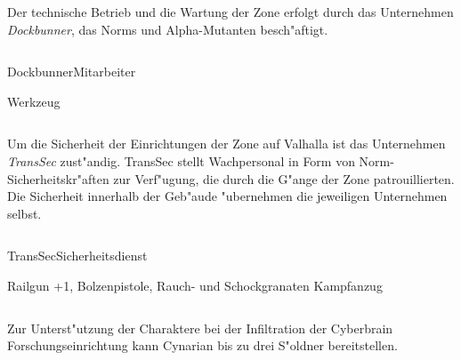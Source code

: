 
\begin{column}[l]{0.45}
    Der technische Betrieb und die Wartung der Zone erfolgt durch das Unternehmen \emph{Dockbunner}, das Norms und Alpha-Mutanten 
    besch"aftigt.
\end{column}
\begin{column}[r]{0.45}
    \begin{nscsheet}[h]{Dockbunner\newline{}Mitarbeiter}
        \nscstats[]
        \nscruler
        \begin{nscinventory}
            \nscitem[Waffen] Werkzeug
        \end{nscinventory}
    \end{nscsheet}
\end{column}    


\begin{column}[l]{0.45}
    Um die Sicherheit der Einrichtungen der Zone auf Valhalla ist das Unternehmen \emph{TransSec} zust"andig. TransSec stellt
    Wachpersonal in Form von Norm-Sicherheitskr"aften zur Verf"ugung, die durch die G"ange der Zone patrouillierten. Die Sicherheit
    innerhalb der Geb"aude "ubernehmen die jeweiligen Unternehmen selbst.
\end{column}
\begin{column}[r]{0.45}
    \begin{nscsheet}[h]{TransSec\newline{}Sicherheitsdienst}
        \nscstats[ATT=2,AGG=2]
        \nscruler
        \begin{nscinventory}
            \nscitem[Waffen] Railgun +1, Bolzenpistole, Rauch- und Schockgranaten
            \nscitem[R"ustung] Kampfanzug
        \end{nscinventory}
    \end{nscsheet}
\end{column}
\vfill

\pagebreak
{}

Zur Unterst"utzung der Charaktere bei der Infiltration der Cyberbrain Forschungseinrichtung kann Cynarian bis zu 
drei S"oldner bereitstellen.

